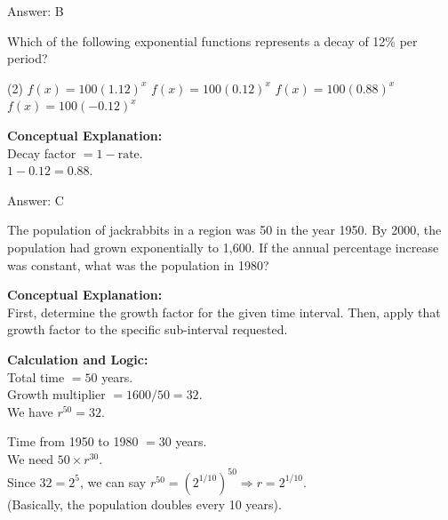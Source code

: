\documentclass[11pt,paper=a4,answers]{exam}
\begin{document}
\begin{questions}
\begin{solution}
\vspace{25pt}

Answer: \colorbox{yellow!100}{B}
\end{solution}

\vspace{40pt}

\question
Which of the following exponential functions represents a decay of 12\% per period?
\begin{tasks}(2)
    \task $f(x) = 100(1.12)^x$
    \task $f(x) = 100(0.12)^x$
    \task $f(x) = 100(0.88)^x$
    \task $f(x) = 100(-0.12)^x$
\end{tasks}

\begin{solution}
\textbf{Conceptual Explanation:} \\
Decay factor $= 1 - \text{rate}$. \\
$1 - 0.12 = 0.88$.

\vspace{25pt}

Answer: \colorbox{yellow!100}{C}
\end{solution}

\vspace{40pt}

\question
The population of jackrabbits in a region was 50 in the year 1950. By 2000, the population had grown exponentially to 1,600. If the annual percentage increase was constant, what was the population in 1980?

\begin{solution}
\textbf{Conceptual Explanation:} \\
First, determine the growth factor for the given time interval. Then, apply that growth factor to the specific sub-interval requested.

\vspace{20pt}

\textbf{Calculation and Logic:} \\
Total time $= 50$ years. \\
Growth multiplier $= 1600/50 = 32$. \\
We have $r^{50} = 32$.

\vspace{10pt}

Time from 1950 to 1980 $= 30$ years. \\
We need $50 \times r^{30}$. \\
Since $32 = 2^5$, we can say $r^{50} = (2^{1/10})^{50} \Rightarrow r = 2^{1/10}$. \\
(Basically, the population doubles every 10 years).


\end{solution}
\end{questions}
\end{document}
